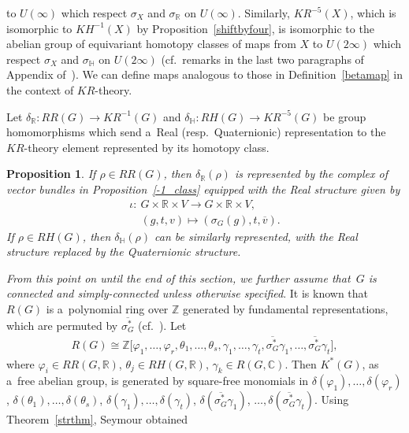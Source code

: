 \documentclass[pdftex]{sigma}
\numberwithin{equation}{section}
\newtheorem{Proposition}[Theorem]{Proposition}
{\theoremstyle{definition}
\newtheorem{Definition}[Theorem]{Definition}
\newtheorem{Example}[Theorem]{Example}
\newtheorem{Remark}[Theorem]{Remark}
}
\begin{document}
to $U(\infty)$ which respect $\sigma_X$ and $\sigma_\mathbb{R}$ on $U(\infty)$.
Similarly, $KR^{-5}(X)$, which is isomorphic to $KH^{-1}(X)$ by Proposition~\ref{shiftbyfour}, is isomorphic to the
abelian group of equivariant homotopy classes of maps from $X$ to $U(2\infty)$
which respect $\sigma_X$ and $\sigma_\mathbb{H}$ on $U(2\infty)$
(cf.\ remarks in the last two paragraphs of Appendix of~\cite{Se}).
We can def\/ine maps analogous to those in Def\/inition~\ref{betamap} in the context of $KR$-theory.
\begin{Definition}
Let $\delta_\mathbb{R}: RR(G)\to KR^{-1}(G)$ and $\delta_\mathbb{H}: RH(G)\to KR^{-5}(G)$ be group homomorphisms which
send a~Real (resp.\
Quaternionic) representation to the $KR$-theory element represented by its homotopy class.
\end{Definition}
\begin{Proposition}
If $\rho\in RR(G)$, then $\delta_\mathbb{R}(\rho)$ is represented by the complex of vector bundles in
Proposition~{\rm \ref{-1_class}} equipped with the Real structure given by
\begin{gather*}
\iota: \ G\times\mathbb{R}\times V  \to  G\times\mathbb{R}\times V,
\\
\phantom{\iota: {}} \
(g, t, v)  \mapsto  (\sigma_G(g), t, \overline{v}).
\end{gather*}
If $\rho\in RH(G)$, then $\delta_\mathbb{H}(\rho)$ can be similarly represented, with the Real structure replaced by the
Quaternionic structure.
\end{Proposition}

\emph{From this point on until the end of this section, we further assume that~$G$ is connected and simply-connected unless
otherwise specified}.
It is known that $R(G)$ is a~polynomial ring over $\mathbb{Z}$ generated by fundamental representations, which are
permuted by $\overline{\sigma_{G}^*}$ (cf.\ \cite[Lemma~5.5]{Se}).
Let
\begin{gather*}
R(G)\cong\mathbb{Z}\big[\varphi_1, \dots, \varphi_r, \theta_1, \dots, \theta_s, \gamma_1, \dots, \gamma_t, \overline{\sigma_G^*}
\gamma_1, \dots, \overline{\sigma_G^*}\gamma_t\big],
\end{gather*}
where $\varphi_i\in RR(G, \mathbb{R})$, $\theta_j\in RH(G, \mathbb{R})$, $\gamma_k\in R(G, \mathbb{C})$.
Then $K^*(G)$, as a~free abelian group, is generated by square-free monomials
in $\delta(\varphi_1), {\dots},\delta(\varphi_r)$,
$\delta(\theta_1), {\dots}, \delta(\theta_s)$,
$\delta(\gamma_1), {\dots}, \delta(\gamma_t)$,
$\delta(\overline{\sigma_G^*}\gamma_1)$, ${\dots}, \delta(\overline{\sigma_G^*}\gamma_t)$.
Using Theorem~\ref{strthm}, Seymour obtained
\end{document}
